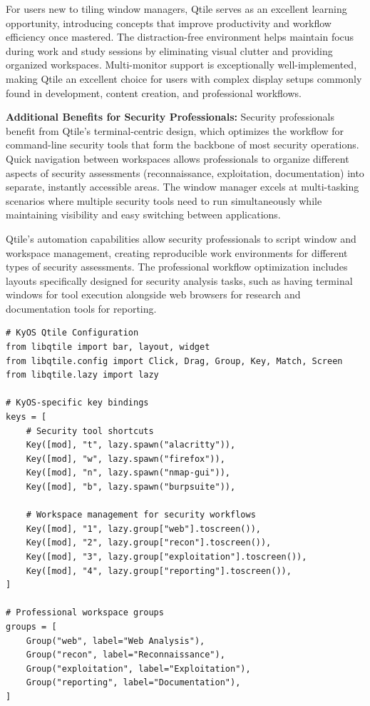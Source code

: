 \documentclass[12pt,a4paper]{article}
\begin{document}
For users new to tiling window managers, Qtile serves as an excellent learning opportunity, introducing concepts that improve productivity and workflow efficiency once mastered. The distraction-free environment helps maintain focus during work and study sessions by eliminating visual clutter and providing organized workspaces. Multi-monitor support is exceptionally well-implemented, making Qtile an excellent choice for users with complex display setups commonly found in development, content creation, and professional workflows.

\textbf{Additional Benefits for Security Professionals:}
Security professionals benefit from Qtile's terminal-centric design, which optimizes the workflow for command-line security tools that form the backbone of most security operations. Quick navigation between workspaces allows professionals to organize different aspects of security assessments (reconnaissance, exploitation, documentation) into separate, instantly accessible areas. The window manager excels at multi-tasking scenarios where multiple security tools need to run simultaneously while maintaining visibility and easy switching between applications.

Qtile's automation capabilities allow security professionals to script window and workspace management, creating reproducible work environments for different types of security assessments. The professional workflow optimization includes layouts specifically designed for security analysis tasks, such as having terminal windows for tool execution alongside web browsers for research and documentation tools for reporting.

\begin{lstlisting}[caption=Qtile Configuration Example]
# KyOS Qtile Configuration
from libqtile import bar, layout, widget
from libqtile.config import Click, Drag, Group, Key, Match, Screen
from libqtile.lazy import lazy

# KyOS-specific key bindings
keys = [
    # Security tool shortcuts
    Key([mod], "t", lazy.spawn("alacritty")),
    Key([mod], "w", lazy.spawn("firefox")),
    Key([mod], "n", lazy.spawn("nmap-gui")),
    Key([mod], "b", lazy.spawn("burpsuite")),
    
    # Workspace management for security workflows
    Key([mod], "1", lazy.group["web"].toscreen()),
    Key([mod], "2", lazy.group["recon"].toscreen()),
    Key([mod], "3", lazy.group["exploitation"].toscreen()),
    Key([mod], "4", lazy.group["reporting"].toscreen()),
]

# Professional workspace groups
groups = [
    Group("web", label="Web Analysis"),
    Group("recon", label="Reconnaissance"),
    Group("exploitation", label="Exploitation"),
    Group("reporting", label="Documentation"),
]
\end{lstlisting}
\end{document}
